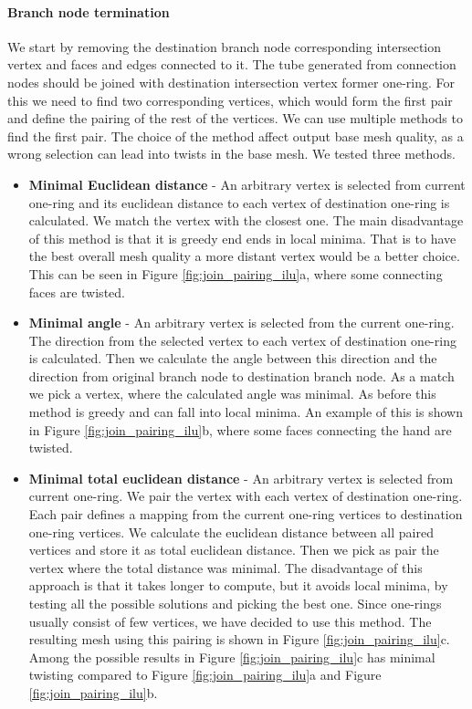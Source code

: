 \paragraph{Branch node termination}
We start by removing the destination branch node corresponding intersection vertex and faces and edges connected to it. The tube generated from connection nodes should be joined with destination intersection vertex former one-ring. For this we need to find two corresponding vertices, which would form the first pair and define the pairing of the rest of the vertices. We can use multiple methods to find the first pair. The choice of the method affect output base mesh quality, as a wrong selection can lead into twists in the base mesh. We tested three methods.
\begin{itemize}
	\itemsep-0.25em 
	\item \textbf{Minimal Euclidean distance} - An arbitrary vertex is selected from current one-ring and its euclidean distance to each vertex of destination one-ring is calculated. We match the vertex with the closest one. The main disadvantage of this method is that it is greedy end ends in local minima. That is to have the best overall mesh quality a more distant vertex would be a better choice. This can be seen in Figure \ref{fig:join_pairing_ilu}a, where some connecting faces are twisted.
	\item \textbf{Minimal angle} - An arbitrary vertex is selected from the current one-ring. The direction from the selected vertex to each vertex of destination one-ring is calculated. Then we calculate the angle between this direction and the direction from original branch node to destination branch node. As a match we pick a vertex, where the calculated angle was minimal. As before this method is greedy and can fall into local minima. An example of this is shown in Figure \ref{fig:join_pairing_ilu}b, where some faces connecting the hand are twisted.
	\item \textbf{Minimal total euclidean distance} - An arbitrary vertex is selected from current one-ring. We pair the vertex with each vertex of destination one-ring. Each pair defines a mapping from the current one-ring vertices to destination one-ring vertices. We calculate the euclidean distance between all paired vertices and store it as total euclidean distance. Then we pick as pair the vertex where the total distance was minimal. The disadvantage of this approach is that it takes longer to compute, but it avoids local minima, by testing all the possible solutions and picking the best one. Since one-rings usually consist of few vertices, we have decided to use this method. The resulting mesh using this pairing is shown in Figure \ref{fig:join_pairing_ilu}c. Among the possible results in Figure \ref{fig:join_pairing_ilu}c has minimal twisting compared to Figure \ref{fig:join_pairing_ilu}a and Figure \ref{fig:join_pairing_ilu}b. 
\end{itemize}

